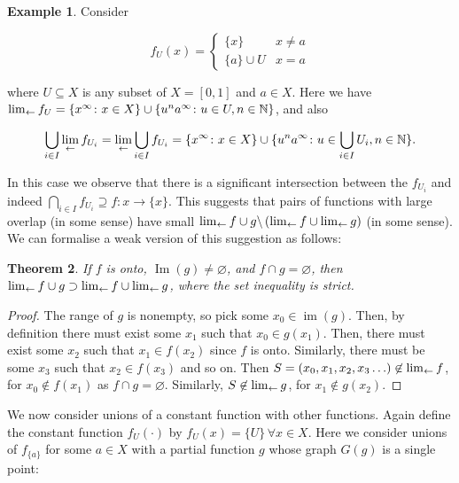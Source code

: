 \documentclass{article}
\newtheorem{thm}{Theorem}
\theoremstyle{definition}
\newtheorem{exam}[thm]{Example}
\let\emptyset\varnothing
\begin{document}
\begin{exam}
Consider

\begin{equation}
  f_U(x) = \begin{cases}
    \lbrace x\rbrace & x\neq a\\
    \lbrace a\rbrace\cup U & x=a
  \end{cases}
\end{equation}

where $U\subseteq X$ is any subset of $X=[0,1]$ and $a\in X$.  Here we
have $\lim_{\leftarrow} f_U=\lbrace x^\infty\colon x\in X\rbrace\cup\lbrace
u^na^\infty\colon u\in U, n\in\mathbb{N}\rbrace$, and also

\begin{equation}
  \bigcup_{i\in I}\lim_{\leftarrow} f_{U_i}=
  \lim_{\leftarrow} \bigcup_{i\in I}f_{U_i}=
  \lbrace x^\infty\colon x\in X\rbrace\cup\lbrace
  u^na^\infty\colon u\in\bigcup_{i\in I}U_i, n\in\mathbb{N}\rbrace.
\end{equation}
\end{exam}

In this case we observe that there is a significant intersection
between the $f_{U_i}$ and indeed $\bigcap_{i\in I}f_{U_i}\supseteq
f\colon x\longrightarrow\lbrace x\rbrace$.  This suggests that pairs
of functions with large overlap (in some sense) have small
$\lim_{\leftarrow} f\cup g\backslash\left(\lim_{\leftarrow} f\cup\lim_{\leftarrow} g\right)$ (in
some sense).  We can formalise a weak version of this suggestion as
follows:

\begin{thm}
If $f$ is onto, $\operatorname{Im}(g)\neq\emptyset$, and $f\cap
g=\emptyset$, then  $\lim_{\leftarrow} f\cup g\supset\lim_{\leftarrow} f\cup\lim_{\leftarrow} g$,
where the set inequality is strict.
\end{thm}

\begin{proof}
The range of $g$ is nonempty, so pick some
$x_0\in\operatorname{im}(g)$.  Then, by definition there must exist
some $x_1$ such that $x_0 \in g(x_1)$.  Then, there must exist some
$x_2$ such that $x_1\in f(x_2)$ since $f$ is onto.  Similarly, there
must be some $x_3$ such that $x_2\in f(x_3)$ and so on.  Then $S=(x_0,
x_1, x_2, x_3\ldots)\not\in\lim_{\leftarrow} f$, for $x_0\not\in f(x_1)$ as
$f\cap g=\emptyset$.  Similarly, $S\not\in\lim_{\leftarrow} g$, for $x_1\not\in
g(x_2)$.
\end{proof}

We now consider unions of a constant function with other functions.
Again define the constant function $f_{U}(\cdot)$ by $f_U(x)=\lbrace
U\rbrace\,\forall x\in X$.  Here we consider unions of $f_{\lbrace
  a\rbrace}$ for some $a\in X$ with a partial function $g$ whose graph
$G(g)$ is a single point:
\end{document}
